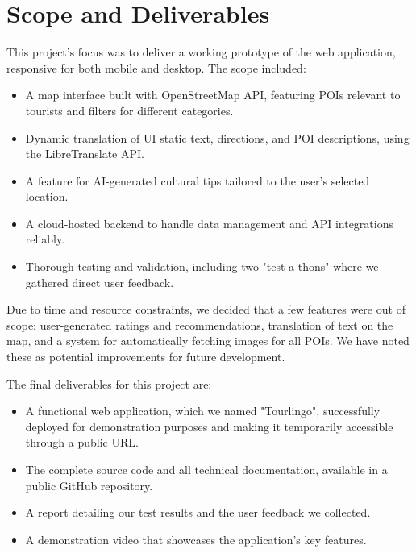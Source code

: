 \section{Scope and Deliverables}
This project's focus was to deliver a working prototype of the web application, responsive for both mobile and desktop. The scope included:
\begin{itemize}
\item A map interface built with OpenStreetMap API, featuring POIs relevant to tourists and filters for different categories.
\item Dynamic translation of UI static text, directions, and POI descriptions, using the LibreTranslate API.
\item A feature for AI-generated cultural tips tailored to the user’s selected location.
\item A cloud-hosted backend to handle data management and API integrations reliably.
\item Thorough testing and validation, including two "test-a-thons" where we gathered direct user feedback.
\end{itemize}

Due to time and resource constraints, we decided that a few features were out of scope: user-generated ratings and recommendations, translation of text on the map, and a system for automatically fetching images for all POIs. We have noted these as potential improvements for future development.

The final deliverables for this project are:
\begin{itemize}
    \item A functional web application, which we named "Tourlingo", successfully deployed for demonstration purposes and making it temporarily accessible through a public URL.
    \item The complete source code and all technical documentation, available in a public GitHub repository.
    \item A report detailing our test results and the user feedback we collected.
    \item A demonstration video that showcases the application's key features.
\end{itemize}
